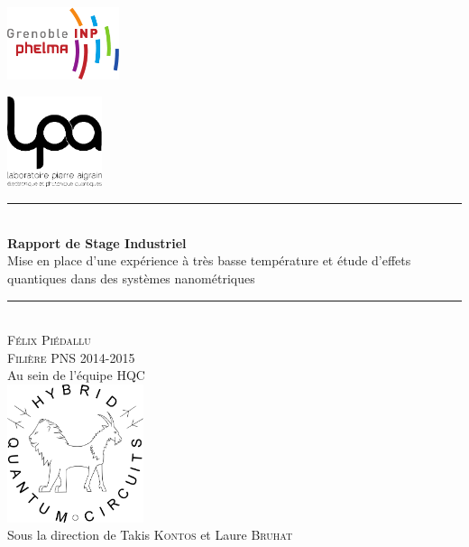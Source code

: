 \begin{titlepage}
    \vspace*{-10px}
    \includegraphics[height=80px]{Images/logo_phelma.pdf}
    \vspace*{-80px}
\begin{flushright}
    \vspace*{-30px}
    \includegraphics[height=100px]{Images/logo_lpa.png}
\end{flushright}

\vspace*{0.5cm}
\begin{center}
\rule{\linewidth}{0.5mm}\\[0.4cm]
{\huge{\bfseries Rapport de Stage Industriel}\\[0.4cm]
Mise en place d'une expérience à très basse température et étude d'effets quantiques dans des systèmes nanométriques\\[0.4cm]}
\rule{\linewidth}{0.5mm}\\[0.5cm]

\LARGE{\textsc{Félix Piédallu}}\\[0.7cm]
\large{\textsc{Filière PNS 2014-2015}}\\[2cm]

\Large{Au sein de l'équipe HQC}\\[1cm]
\includegraphics[width=0.3\textwidth]{Images/logo_HQC.pdf}\\[1cm]

\large{Sous la direction de Takis \textsc{Kontos} et Laure \textsc{Bruhat}}\\[2cm]


\end{center}
\end{titlepage}

\tableofcontents        %
\newpage
{}  %
